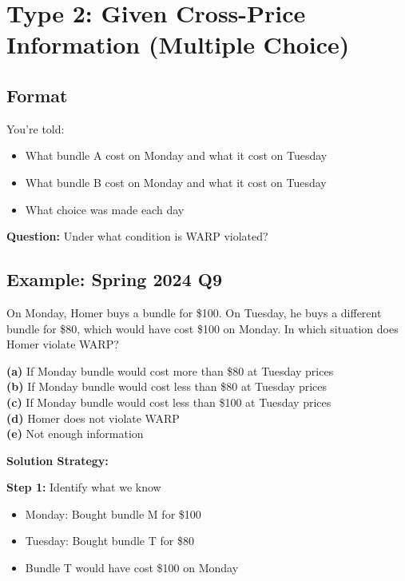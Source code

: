 \documentclass[11pt]{article}
\begin{document}
\newpage

\section{Type 2: Given Cross-Price Information (Multiple Choice)}

\subsection{Format}

You're told:
\begin{itemize}
\item What bundle A cost on Monday and what it cost on Tuesday
\item What bundle B cost on Monday and what it cost on Tuesday
\item What choice was made each day
\end{itemize}

\textbf{Question:} Under what condition is WARP violated?

\subsection{Example: Spring 2024 Q9}

\begin{tcolorbox}[colback=blue!5!white,colframe=blue!75!black,title=Problem]
On Monday, Homer buys a bundle for \$100. On Tuesday, he buys a different bundle for \$80, which would have cost \$100 on Monday. In which situation does Homer violate WARP?

\textbf{(a)} If Monday bundle would cost more than \$80 at Tuesday prices\\
\textbf{(b)} If Monday bundle would cost less than \$80 at Tuesday prices\\
\textbf{(c)} If Monday bundle would cost less than \$100 at Tuesday prices\\
\textbf{(d)} Homer does not violate WARP\\
\textbf{(e)} Not enough information
\end{tcolorbox}

\textbf{Solution Strategy:}

\textbf{Step 1:} Identify what we know
\begin{itemize}
\item Monday: Bought bundle M for \$100
\item Tuesday: Bought bundle T for \$80
\item Bundle T would have cost \$100 on Monday
\end{itemize}
\end{document}
